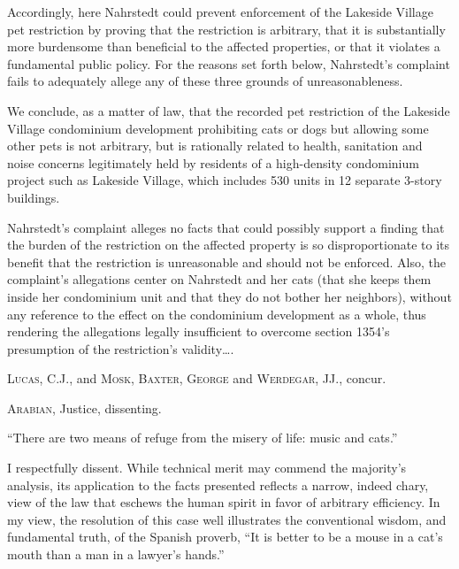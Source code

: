 Accordingly, here Nahrstedt could prevent enforcement of the Lakeside Village
pet restriction by proving that the restriction is arbitrary, that it is
substantially more burdensome than beneficial to the affected properties, or
that it violates a fundamental public policy. For the reasons set forth below,
Nahrstedt's complaint fails to adequately allege any of these three grounds of
unreasonableness.

We conclude, as a matter of law, that the recorded pet restriction of the
Lakeside Village condominium development prohibiting cats or dogs but allowing
some other pets is not arbitrary, but is rationally related to health,
sanitation and noise concerns legitimately held by residents of a high-density
condominium project such as Lakeside Village, which includes 530 units in 12
separate 3-story buildings.

Nahrstedt's complaint alleges no facts that could possibly support a finding
that the burden of the restriction on the affected property is so
disproportionate to its benefit that the restriction is unreasonable and should
not be enforced. Also, the complaint's allegations center on Nahrstedt and her
cats (that she keeps them inside her condominium unit and that they do not
bother her neighbors), without any reference to the effect on the condominium
development as a whole, thus rendering the allegations legally insufficient to
overcome section 1354's presumption of the restriction's validity\ldots .

\textsc{Lucas}, C.J., and \textsc{Mosk, Baxter, George} and \textsc{Werdegar},
JJ., concur.

\opinion \textsc{Arabian}, Justice, dissenting.

``There are two means of refuge from the misery of life: music and
cats.''

I respectfully dissent. While technical merit may commend the majority's
analysis, its application to the facts presented reflects a narrow, indeed
chary, view of the law that eschews the human spirit in favor of arbitrary
efficiency. In my view, the resolution of this case well illustrates the
conventional wisdom, and fundamental truth, of the Spanish proverb, ``It is
better to be a mouse in a cat's mouth than a man in a lawyer's hands.''

